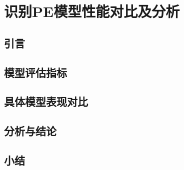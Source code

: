 \chapter{识别PE模型性能对比及分析}
\section{引言}
\section{模型评估指标}
\section{具体模型表现对比}
\section{分析与结论}
\section{小结}
